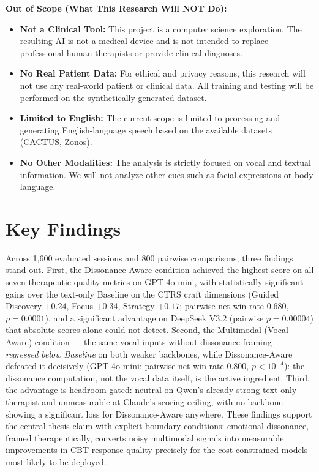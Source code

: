 \textbf{Out of Scope (What This Research Will NOT Do):}
\begin{itemize}
    \item \textbf{Not a Clinical Tool:} This project is a computer science exploration. The resulting AI is not a medical device and is not intended to replace professional human therapists or provide clinical diagnoses.
    \item \textbf{No Real Patient Data:} For ethical and privacy reasons, this research will not use any real-world patient or clinical data. All training and testing will be performed on the synthetically generated dataset.
    \item \textbf{Limited to English:} The current scope is limited to processing and generating English-language speech based on the available datasets (CACTUS, Zonos).
    \item \textbf{No Other Modalities:} The analysis is strictly focused on vocal and textual information. We will not analyze other cues such as facial expressions or body language.
\end{itemize}

\section{Key Findings}

Across 1,600 evaluated sessions and 800 pairwise comparisons, three findings stand out. First, the Dissonance-Aware condition achieved the highest score on all seven therapeutic quality metrics on GPT-4o mini, with statistically significant gains over the text-only Baseline on the CTRS craft dimensions (Guided Discovery $+0.24$, Focus $+0.34$, Strategy $+0.17$; pairwise net win-rate $0.680$, $p = 0.0001$), and a significant advantage on DeepSeek V3.2 (pairwise $p = 0.00004$) that absolute scores alone could not detect. Second, the Multimodal (Vocal-Aware) condition --- the same vocal inputs without dissonance framing --- \emph{regressed below Baseline} on both weaker backbones, while Dissonance-Aware defeated it decisively (GPT-4o mini: pairwise net win-rate $0.800$, $p < 10^{-4}$): the dissonance computation, not the vocal data itself, is the active ingredient. Third, the advantage is headroom-gated: neutral on Qwen's already-strong text-only therapist and unmeasurable at Claude's scoring ceiling, with no backbone showing a significant loss for Dissonance-Aware anywhere. These findings support the central thesis claim with explicit boundary conditions: emotional dissonance, framed therapeutically, converts noisy multimodal signals into measurable improvements in CBT response quality precisely for the cost-constrained models most likely to be deployed.

